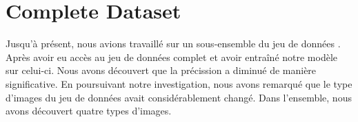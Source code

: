 \documentclass[11pt]{article}
\begin{document}
\section{Complete Dataset}
Jusqu'à présent, nous avions travaillé sur un sous-ensemble du jeu de données
. Après avoir eu accès au jeu de données complet et avoir entraîné notre modèle
sur celui-ci. Nous avons découvert que la précission a diminué de manière
significative. En poursuivant notre investigation, nous avons remarqué que le
type d'images du jeu de données avait considérablement changé. Dans l'ensemble,
nous avons découvert quatre types d'images.
\end{document}
